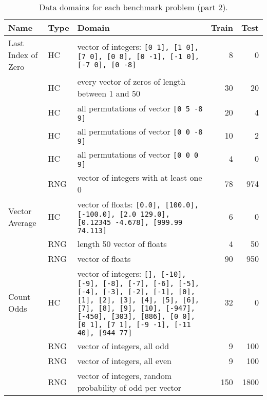 \documentclass{sig-alternate}
\begin{document}
\begin{table*}
\centering
\caption{Data domains for each benchmark problem (part 2).}
\label{datadomains2}
\begin{tabular}{>{\raggedright}p{3.5cm} l >{\raggedright}p{9.8cm} rr}
\toprule
\textbf{Name} & \textbf{Type} & \textbf{Domain} & \textbf{Train} & \textbf{Test} \\
\midrule
Last Index of Zero & HC & vector of integers: \texttt{[0 1], [1 0], [7 0], [0 8], [0 -1], [-1 0], [-7 0], [0 -8]} & 8 & 0 \tabularnewline
 & HC & every vector of zeros of length between 1 and 50 & 30 & 20 \tabularnewline
 & HC & all permutations of vector \texttt{[0 5 -8 9]} & 20 & 4 \tabularnewline
 & HC & all permutations of vector \texttt{[0 0 -8 9]} & 10 & 2 \tabularnewline
 & HC & all permutations of vector \texttt{[0 0 0 9]} & 4 & 0 \tabularnewline
 & RNG & vector of integers with at least one 0 & 78 & 974 \tabularnewline
\rowcolor{Gray} Vector Average & HC & vector of floats: \texttt{[0.0], [100.0], [-100.0], [2.0 129.0], [0.12345 -4.678], [999.99 74.113]} & 6 & 0 \tabularnewline
\rowcolor{Gray}  & RNG & length 50 vector of floats & 4 & 50 \tabularnewline
\rowcolor{Gray}  & RNG & vector of floats & 90 & 950 \tabularnewline
Count Odds & HC & vector of integers: \texttt{[], [-10], [-9], [-8], [-7], [-6], [-5], [-4], [-3], [-2], [-1], [0], [1], [2], [3], [4], [5], [6], [7], [8], [9], [10], [-947], [-450], [303], [886], [0 0], [0 1], [7 1], [-9 -1], [-11 40], [944 77]} & 32 & 0 \tabularnewline
 & RNG & vector of integers, all odd & 9 & 100 \tabularnewline
 & RNG & vector of integers, all even & 9 & 100 \tabularnewline
 & RNG & vector of integers, random probability of odd per vector & 150 & 1800 \tabularnewline

\end{tabular}
\end{table*}
\end{document}
